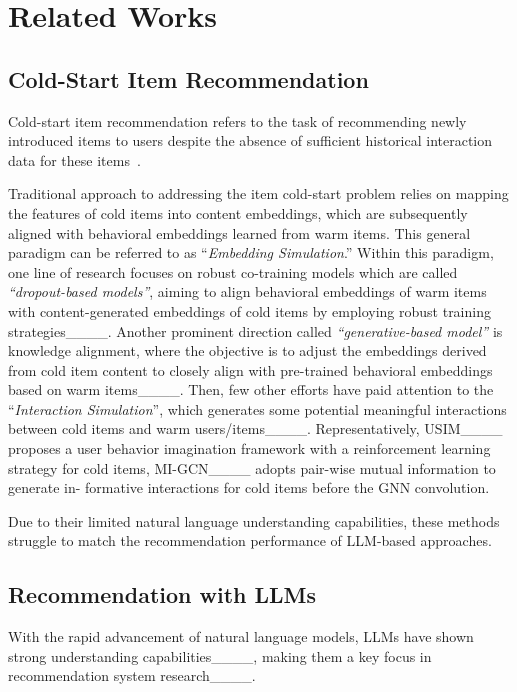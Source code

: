 \section{Related Works}
\subsection{Cold-Start Item Recommendation}
Cold-start item recommendation refers to the task of recommending newly introduced items to users despite the absence of sufficient historical interaction data for these items~\cite {zhang2025cold,liu2024fine,bai2023gorec,zhang2024logical}. 

Traditional approach to addressing the item cold-start problem relies on mapping the features of cold items into content embeddings, which are subsequently aligned with behavioral embeddings learned from warm items. This general paradigm can be referred to as ``\textit{Embedding Simulation}.'' Within this paradigm, one line of research focuses on robust co-training models which are called \textit{``dropout-based models''}, aiming to align behavioral embeddings of warm items with content-generated embeddings of cold items by employing robust training strategies____.
Another prominent direction called \textit{``generative-based model''} is knowledge alignment, where the objective is to adjust the embeddings derived from cold item content to closely align with pre-trained behavioral embeddings based on warm items____. Then, few other efforts have paid attention to the ``\textit{Interaction Simulation}'', which generates some potential meaningful interactions between cold items and warm users/items____. Representatively, USIM____ proposes a user behavior imagination framework with a reinforcement learning strategy for cold items,
MI-GCN____ adopts pair-wise mutual information to generate in-
formative interactions for cold items before the GNN convolution.

Due to their limited natural language understanding capabilities, these methods struggle to match the recommendation performance of LLM-based approaches.


\subsection{Recommendation with LLMs}
With the rapid advancement of natural language models, LLMs have shown strong understanding capabilities____, making them a key focus in recommendation system research____.



